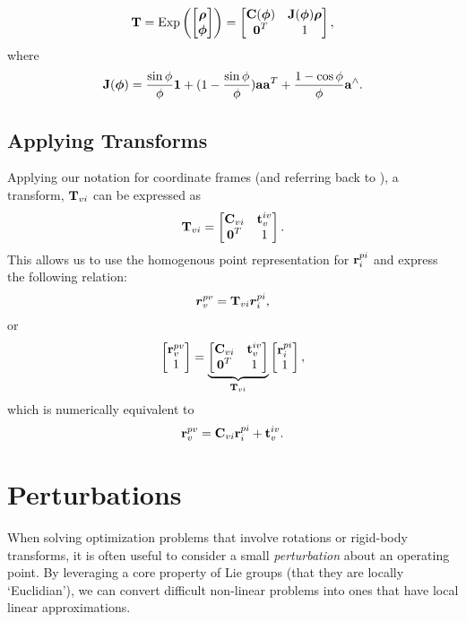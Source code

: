 \begin{equation}
\boldsymbol{\mathbf{T}} = \mathrm{Exp}\left({\begin{bmatrix} \boldsymbol{\mathbf{\rho}} \\ \boldsymbol{\mathbf{\phi}} \end{bmatrix}}\right) = \begin{bmatrix} \boldsymbol{\mathbf{C}}(\boldsymbol{\mathbf{\phi}}) & \boldsymbol{\mathbf{J}}(\boldsymbol{\mathbf{\phi}}) \boldsymbol{\mathbf{\rho}} \\ \boldsymbol{\mathbf{0}}^T & 1 \end{bmatrix},
\end{equation}
where
\begin{equation}
\boldsymbol{\mathbf{J}}(\boldsymbol{\mathbf{\phi}}) = \frac{\sin{\phi}}{\phi} \boldsymbol{\mathbf{1}} + (1 - \frac{\sin{\phi}}{\phi}) \boldsymbol{\mathbf{a}}\boldsymbol{\mathbf{a}}^T + \frac{1 - \cos{\phi}}{\phi} \boldsymbol{\mathbf{a}}^\wedge.
\end{equation}




\subsection{Applying Transforms}
Applying our notation for coordinate frames (and referring back to ), a transform, $\boldsymbol{\mathbf{T}}_{vi}$ can be expressed as 
\begin{equation}
\boldsymbol{\mathbf{T}}_{vi} = \begin{bmatrix} \boldsymbol{\mathbf{C}}_{vi} & \boldsymbol{\mathbf{t}}_v^{iv} \\ \boldsymbol{\mathbf{0}}^T & 1 \end{bmatrix}.
\end{equation}
This allows us to use the homogenous point representation for $\boldsymbol{\mathbf{r}}^{pi}_i$ and express the following relation:
\begin{equation}
	\boldsymbol{r}^{pv}_v = \boldsymbol{\mathbf{T}}_{vi} \boldsymbol{r}^{pi}_i,
\end{equation}
or
\begin{equation}
	\begin{bmatrix} \boldsymbol{\mathbf{r}}^{pv}_v \\ 1 \end{bmatrix} = \underbrace{\begin{bmatrix} \boldsymbol{\mathbf{C}}_{vi} & \boldsymbol{\mathbf{t}}_v^{iv} \\ \boldsymbol{\mathbf{0}}^T & 1 \end{bmatrix}}_{\boldsymbol{\mathbf{T}}_{vi}} \begin{bmatrix} \boldsymbol{\mathbf{r}}^{pi}_i \\ 1 \end{bmatrix},
\end{equation}
which is numerically equivalent to  
\begin{equation}
 \boldsymbol{\mathbf{r}}^{pv}_v =  \boldsymbol{\mathbf{C}}_{vi} \boldsymbol{\mathbf{r}}^{pi}_i + \boldsymbol{\mathbf{t}}_v^{iv}.  
 \end{equation}

\section{Perturbations}

When solving optimization problems that involve rotations or rigid-body transforms, it is often useful to consider a small \textit{perturbation} about an operating point. By leveraging a core property of Lie groups (that they are locally `Euclidian'), we can convert difficult non-linear problems into ones that have local linear approximations.

